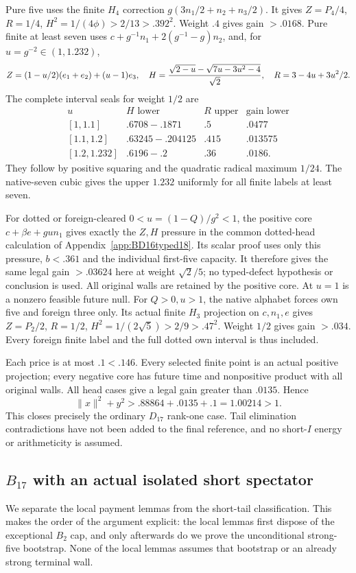 \documentclass[11pt]{article}
\theoremstyle{definition}
\theoremstyle{remark}
\newcommand{\norm}[1]{\lVert #1\rVert}
\begin{document}
Pure five uses the finite \(H_4\) correction
\(g(3n_1/2+n_2+n_3/2)\). It gives \(Z=P_4/4\), \(R=1/4\),
\(H^2=1/(4\phi)>2/13>.392^2\). Weight \(.4\) gives
gain \(>.0168\). Pure finite at least seven uses
\(c+g^{-1}n_1+2(g^{-1}-g)n_2\), and, for
\(u=g^{-2}\in(1,1.232)\),
\[
 Z=(1-u/2)(e_1+e_2)+(u-1)e_3,\quad
 H={\sqrt{2-u}-\sqrt{7u-3u^2-4}\over\sqrt2},\quad
 R=3-4u+3u^2/2.
\]
The complete interval seals for weight \(1/2\) are
\[
\begin{array}{c|c|c|c}
u& H\text{ lower}&R\text{ upper}&\text{gain lower}\\\hline
{}[1,1.1]&.6708-.1871&.5&.0477\\
{}[1.1,1.2]&.63245-.204125&.415&.013575\\
{}[1.2,1.232]&.6196-.2&.36&.0186.
\end{array}
\]
They follow by positive squaring and the quadratic radical maximum
\(1/24\). The native-seven cubic gives the upper \(1.232\)
uniformly for all finite labels at least seven.

For dotted or foreign-cleared \(0<u=(1-Q)/g^2<1\), the positive
core \(c+\beta e+gu n_1\) gives exactly the \(Z,H\)
pressure in the common dotted-head calculation of
Appendix~\ref{app:BD16typed18}. Its scalar proof uses only this
pressure, \(b<.361\) and the individual first-five capacity.
It therefore gives the same legal gain \(>.03624\) here at
weight \(\sqrt2/5\); no typed-defect hypothesis or conclusion
is used. All original walls are retained by the positive core.
At \(u=1\) is a nonzero feasible future null.
For \(Q>0,u>1\), the native alphabet forces own five and
foreign three only. Its actual finite \(H_3\) projection on
\(c,n_1,e\) gives \(Z=P_2/2\), \(R=1/2\),
\(H^2=1/(2\sqrt5)>2/9>.47^2\). Weight \(1/2\) gives
gain \(>.034\). Every foreign finite label and the full dotted
own interval is thus included.

Each price is at most \(.1<.146\). Every selected finite point
is an actual positive projection; every negative core has future
time and nonpositive product with all original walls. All head
cases give a legal gain greater than \(.0135\). Hence
\[
 \norm x^2+y^2>.88864+.0135+.1=1.00214>1.
\]
This closes precisely the ordinary \(D_{17}\) rank-one case.
Tail elimination contradictions have not been added to the final
reference, and no short-\(I\) energy or arithmeticity is assumed.

\subsection{\(B_{17}\) with an actual isolated short spectator}
\label{app:B17I18}
We separate the local payment lemmas from the short-tail classification.
This makes the order of the argument explicit: the local lemmas first
dispose of the exceptional \(B_2\) cap, and only afterwards do we prove
the unconditional strong-five bootstrap. None of the local lemmas assumes
that bootstrap or an already strong terminal wall.
\end{document}
